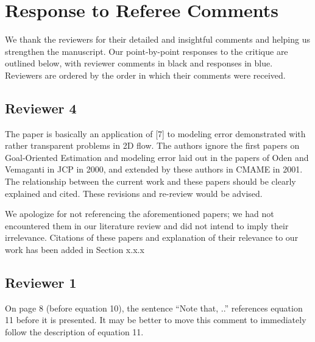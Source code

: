 \documentclass[12pt, letterpaper]{article}
\newcommand{\answer}[1]{\begin{adjustwidth}{1cm}{}{\color{blue}#1}\end{adjustwidth}}
\newcommand{\red}[1]{{\color{red}#1}}
\newcommand{\blue}[1]{{\color{blue}#1}}
\newcommand{\notdone}{{\color{red}{Changes not yet made.}}}
\begin{document}

\section*{Response to Referee Comments}

We thank the reviewers for their detailed and insightful comments and helping us strengthen the manuscript. Our point-by-point responses to the critique are outlined below, with reviewer comments in black and \blue{responses in blue}. Reviewers are ordered by the order in which their comments were received.


\subsection*{Reviewer 4}

The paper is basically an application of [7] to modeling error demonstrated with rather transparent problems in 2D flow. The authors ignore the first papers on Goal-Oriented Estimation and modeling error laid out in the papers of Oden and Vemaganti in JCP in 2000, and extended by these authors in CMAME in 2001. The relationship between the current work and these papers should be clearly explained and cited. These revisions and re-review would be advised.

\answer{We apologize for not referencing the aforementioned papers; we had not encountered them in our literature review and did not intend to imply their irrelevance. Citations of these papers and explanation of their relevance to our work has been added in \red{Section x.x.x}}
\notdone


\subsection*{Reviewer 1}

On page 8 (before equation 10), the sentence “Note that, ..” references equation 11 before it is
presented. It may be better to move this comment to immediately follow the description of equation
11.
\end{document}
